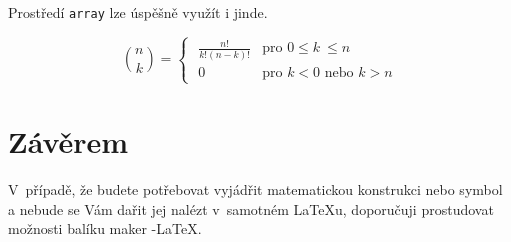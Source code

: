 \documentclass[11pt,a4paper,twocolumn]{article}
\begin{document}
	\normalsize
	
	Prostředí \texttt{array} lze úspěšně využít i jinde.
	
	$$  \binom{n}{k} =
		\begin{cases}
			\,\,
			\frac{n!}{k!(n-k)!} & \text{pro $0 \leq k~\leq n$} \\
			\,\,
			0 					& \text{pro $k < 0$ nebo $k > n$}
		\end{cases}$$
	
	\section{Závěrem}

	V~případě, že budete potřebovat vyjádřit matematickou konstrukci nebo symbol a nebude se Vám dařit jej nalézt v~samotném \LaTeX u, doporučuji prostudovat možnosti balíku maker \AmS -\LaTeX.
	
\end{document}
